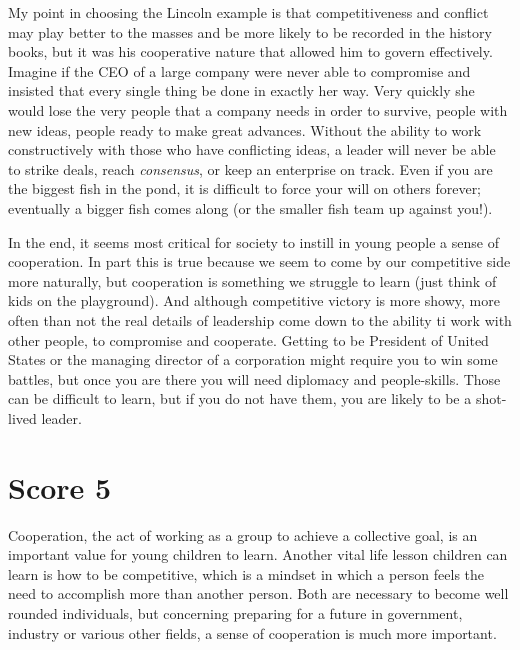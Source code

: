 My point in choosing the Lincoln example is that competitiveness and conflict may play better to the masses and be more likely to be recorded in the history books, but it was his cooperative nature that allowed him to govern effectively.
Imagine if the CEO of a large company were never able to compromise and insisted that every single thing be done in exactly her way.
Very quickly she would lose the very people that a company needs in order to survive, people with new ideas, people ready to make great advances.
Without the ability to work constructively with those who have conflicting ideas, a leader will never be able to strike deals, reach \emph{consensus}, or keep an enterprise on track.
Even if you are the biggest fish in the pond, it is difficult to force your will on others forever; eventually a bigger fish comes along (or the smaller fish team up against you!).

In the end, it seems most critical for society to instill in young people a sense of cooperation.
In part this is true because we seem to come by our competitive side more naturally, but cooperation is something we struggle to learn (just think of kids on the playground).
And although competitive victory is more showy, more often than not the real details of leadership come down to the ability ti work with other people, to compromise and cooperate.
Getting to be President of United States or the managing director of a corporation might require you to win some battles, but once you are there you will need diplomacy and people-skills.
Those can be difficult to learn, but if you do not have them, you are likely to be a shot-lived leader.


\section{Score 5}
Cooperation, the act of working as a group to achieve a collective goal, is an important value for young children to learn.
Another vital life lesson children can learn is how to be competitive, which is a mindset in which a person feels the need to accomplish more than another person.
Both are necessary to become well rounded individuals, but concerning preparing for a future in government, industry or various other fields, a sense of cooperation is much more important.


